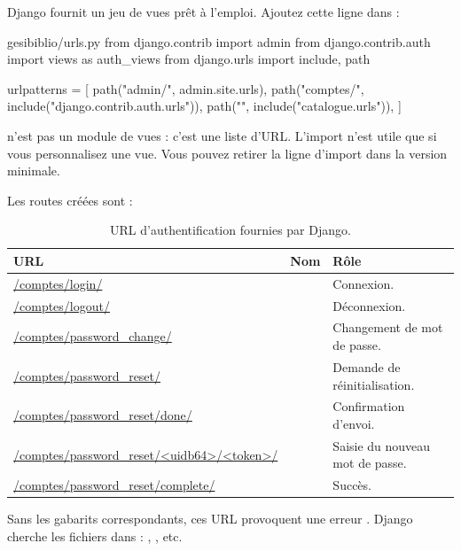 Django fournit un jeu de vues prêt à l'emploi. Ajoutez cette ligne dans
 :

\begin{codebox}[python]{gesibiblio/urls.py}
from django.contrib import admin
from django.contrib.auth import views as auth_views
from django.urls import include, path

urlpatterns = [
    path("admin/", admin.site.urls),
    path("comptes/", include("django.contrib.auth.urls")),
    path("", include("catalogue.urls")),
]
\end{codebox}

\begin{note}
 n'est pas un module de vues : c'est une liste
d'URL. L'import  n'est utile que si vous personnalisez une vue.
Vous pouvez retirer la ligne d'import dans la version minimale.
\end{note}

Les routes créées sont :

\begin{table}[htbp]
\centering
\small
\begin{tabularx}{\textwidth}{L{5.4cm} L{5.0cm} X}
\toprule
\textbf{URL} & \textbf{Nom} & \textbf{Rôle} \\
\midrule
\url{/comptes/login/} &  & Connexion. \\
\url{/comptes/logout/} &  & Déconnexion. \\
\url{/comptes/password_change/} &  & Changement de mot de
passe. \\
\url{/comptes/password_reset/} &  & Demande de
réinitialisation. \\
\url{/comptes/password_reset/done/} &  & Confirmation
d'envoi. \\
\url{/comptes/password_reset/<uidb64>/<token>/} &
 & Saisie du nouveau mot de passe. \\
\url{/comptes/password_reset/complete/} &  &
Succès. \\
\bottomrule
\end{tabularx}
\caption{URL d'authentification fournies par Django.}
\end{table}

\begin{attention}
Sans les gabarits correspondants, ces URL provoquent une erreur
. Django cherche les fichiers dans
 : ,
, etc.
\end{attention}

